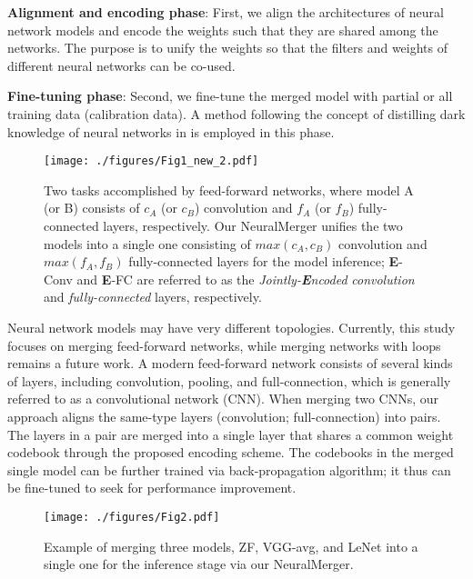 \documentclass{article}
\begin{document}
	\noindent \textbf{Alignment and encoding phase}: First, we align the architectures of neural network models and encode the weights
	such that they are shared among the networks.
	The purpose is to unify the weights so that the filters and weights of different neural networks can be co-used.
	
	\noindent \textbf{Fine-tuning phase}: Second, we fine-tune the merged model with partial or all training data (calibration data). A method following the concept of distilling dark knowledge of neural networks in \cite{HintonDistilling14} is employed in this phase.
	
	\begin{figure}[t]
		\begin{center}
			\texttt{[image: ./figures/Fig1\_new\_2.pdf]}
		\end{center}
		\vspace{-0.1cm}
		\caption{Two tasks accomplished by feed-forward networks, where model A (or B) consists of $c_A$ (or $c_B$) convolution and $f_A$ (or $f_B$) fully-connected layers, respectively. Our NeuralMerger unifies the two models into a single one consisting of $max(c_A, c_B)$ convolution and $max(f_A, f_B)$ fully-connected layers for the model inference; \textbf{E}-Conv and \textbf{E}-FC are referred to as the \emph{Jointly-\textbf{E}ncoded} \emph{convolution} and \emph{fully-connected} layers, respectively.%
		}
		\label{fig:concept}
	\end{figure}
	
	Neural network models may have very different topologies.
	Currently, this study focuses on merging feed-forward networks, while merging networks with loops remains a future work.
	A modern feed-forward network consists of several kinds of layers, including convolution, pooling, and full-connection, which is generally referred to as a convolutional network (CNN).
	When merging two CNNs, our approach aligns the same-type layers (convolution; full-connection) into pairs.
	The layers in a pair are merged into a single layer that shares a common weight codebook through the proposed encoding scheme.
	The codebooks in the merged single model can be further trained via back-propagation algorithm; it thus can be fine-tuned to seek for performance improvement.
	
	\begin{figure}[t]
		\begin{center}
			\texttt{[image: ./figures/Fig2.pdf]}
		\end{center}
		\vspace{-0.35cm}
		\caption{Example of merging three models, ZF, VGG-avg, and LeNet into a single one for the inference stage via our NeuralMerger.}
		\label{fig:mergemore}
	\end{figure}
	
\end{document}
